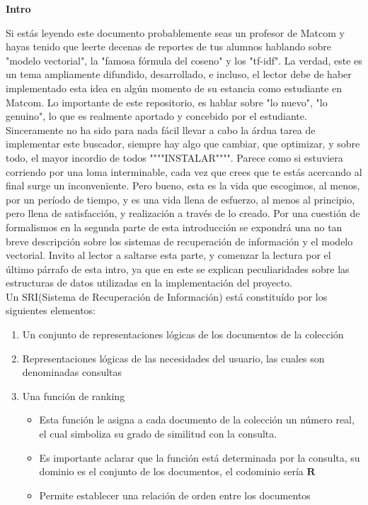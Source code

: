 \documentclass[12pt]{article}
\begin{document}
	
  \textbf{Intro}
  
    Si est\'as leyendo este documento probablemente seas un profesor de Matcom y hayas tenido que leerte decenas de reportes de tus alumnos hablando sobre "modelo vectorial", la "famosa f\'ormula del coseno" y los "tf-idf". La verdad, este es un tema ampliamente difundido, desarrollado, e incluso, el lector debe de haber implementado esta idea en alg\'un momento de su estancia como estudiante en Matcom. Lo importante de este repositorio, es hablar sobre "lo nuevo", "lo genuino", lo que es realmente aportado y concebido por el estudiante. Sinceramente no ha sido para nada f\'acil llevar a cabo la \'ardua tarea de implementar este buscador, siempre hay algo que cambiar, que optimizar, y sobre todo, el mayor incordio de todos """"INSTALAR"""". Parece como si estuviera corriendo por una loma interminable, cada vez que crees que te est\'as acercando al final surge un inconveniente. Pero bueno, esta es la vida que escogimos, al menos, por un per\'iodo de tiempo, y es una vida llena de esfuerzo, al menos al principio, pero llena de satisfacci\'on, y realizaci\'on a trav\'es de lo creado. Por una cuesti\'on de formalismos en la segunda parte de esta introducci\'on se expondr\'a una no tan breve descripci\'on sobre los sistemas de recuperaci\'on de informaci\'on y el modelo vectorial. Invito al lector a saltarse esta parte, y comenzar la lectura por el \'ultimo p\'arrafo de esta intro, ya que en este se explican peculiaridades sobre las estructuras de datos utilizadas en la implementaci\'on del proyecto. \\
  
  
  Un SRI(Sistema de Recuperaci\'on de Informaci\'on) est\'a constitu\'ido por los siguientes elementos:
  \begin{enumerate}
  	\item Un conjunto de representaciones l\'ogicas de los documentos de la colecci\'on 
  	\item Representaciones l\'ogicas de las necesidades del usuario, las cuales son denominadas consultas
  	\item Una funci\'on de ranking 
  	\begin{itemize}
  	\item Esta funci\'on le asigna a cada documento de la colecci\'on un n\'umero real, el cual simboliza su grado de similitud con la consulta.
  	\item Es importante aclarar que la funci\'on est\'a determinada por la consulta, su dominio es el conjunto de los documentos, el codominio ser\'ia $\mathbf{R}$
  	\item Permite establecer una relaci\'on de orden entre los documentos
  	\end{itemize}
  \end{enumerate}	
   
\end{document}
